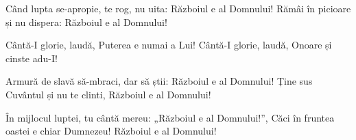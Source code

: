 \beginverse
Când lupta se-apropie, te rog, nu uita:
Războiul e al Domnului!
Rămâi în picioare și nu dispera:
Războiul e al Domnului!
\endverse

\beginchorus
Cântă-I glorie, laudă,
Puterea e numai a Lui!
Cântă-I glorie, laudă,
Onoare și cinste adu-I!
\endchorus

\beginverse
Armură de slavă să-mbraci, dar să știi:
Războiul e al Domnului!
Ține sus Cuvântul și nu te clinti,
Războiul e al Domnului!
\endverse

\beginverse
În mijlocul luptei, tu cântă mereu:
„Războiul e al Domnului!”,
Căci în fruntea oastei e chiar Dumnezeu!
Războiul e al Domnului!
\endverse
\endsong